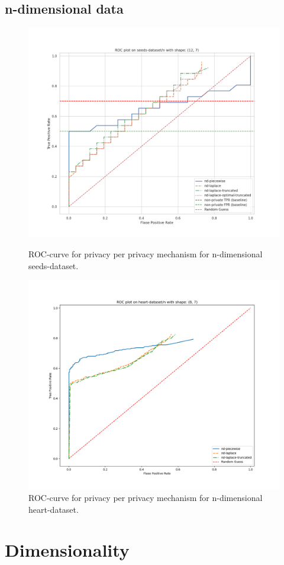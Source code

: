 \subsection{n-dimensional data}
\begin{figure}[H]
    \centering
    \begin{minipage}[c]{0.49\textwidth}
        \includegraphics[width=1\textwidth]{Results/RQ2-nd/seeds-dataset/roc_plot.png}
        \caption{ROC-curve for privacy per privacy mechanism for n-dimensional seeds-dataset.}
        \label{fig:privacy_seeds-dataset_comparison_nd_roc_plot}
    \end{minipage}
    \begin{minipage}[c]{0.49\textwidth}
        \includegraphics[width=1\textwidth]{Results/RQ2-nd/heart-dataset/roc_plot.png}
        \caption{ROC-curve for privacy per privacy mechanism for n-dimensional heart-dataset.}
        \label{fig:privacy_heart-dataset_comparison_nd_roc_plot}
    \end{minipage}
\end{figure}
%
%
\newpage
\section{Dimensionality}
